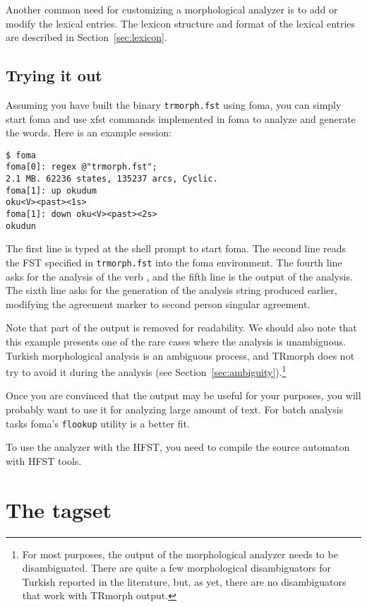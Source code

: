 \documentclass[twocolumn]{article}
\begin{document}
Another common need for customizing a morphological analyzer is to add
or modify the lexical entries. The lexicon structure and format of the
lexical entries are described in Section~\ref{sec:lexicon}.

\subsection{Trying it out}

Assuming you have built the binary \lstinline{trmorph.fst} using foma,
you can simply start foma and use xfst commands implemented in foma to
analyze and generate the words. Here is an example session:

\begin{lstlisting}[basicstyle={\color{blue!60!black!90}\small\tt}]
$ foma
foma[0]: regex @"trmorph.fst";
2.1 MB. 62236 states, 135237 arcs, Cyclic.
foma[1]: up okudum
oku<V><past><1s>
foma[1]: down oku<V><past><2s>
okudun
\end{lstlisting}%

The first line is  typed at the shell prompt to start foma.  The
second line reads the FST specified in \lstinline{trmorph.fst} into
the foma environment. The fourth line asks for the analysis of the verb
, and the fifth line is the output of the
analysis. The sixth line asks for the generation of the analysis string
produced earlier, modifying the agreement marker to  second person
singular agreement.

Note that part of the output is removed for readability. We should
also note that this example presents one of the rare cases where the
analysis is unambiguous. Turkish morphological analysis is an
ambiguous process, and TRmorph does not try to avoid it during the
analysis (see Section~\ref{sec:ambiguity}).\footnote{For most
purposes, the output of the morphological analyzer needs to be
disambiguated.  There are quite a few morphological disambiguators for
Turkish reported in the literature, but, as yet, there are no 
disambiguators that work with TRmorph output.}

Once you are convinced that the output may be useful for your
purposes, you will probably want to use it for analyzing large amount
of text. For batch analysis tasks  foma's \lstinline{flookup} utility
is a better fit. 

To use the analyzer with the HFST, you need to compile the source
automaton with HFST tools. 

\section{The tagset}
\end{document}
